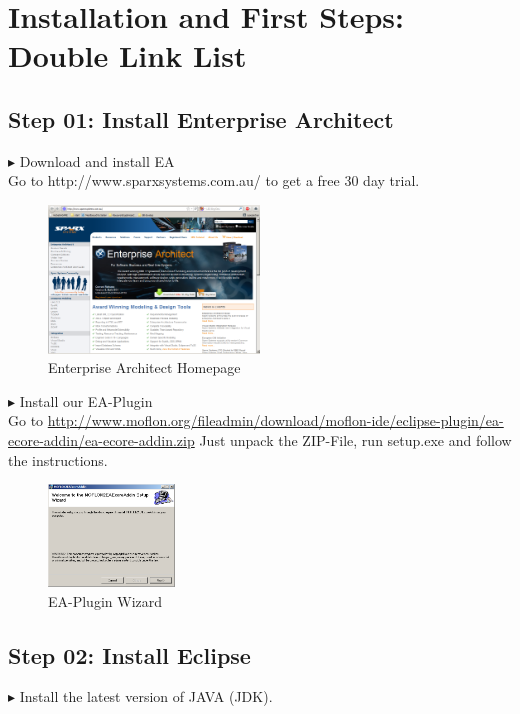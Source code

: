 \section{Installation and First Steps: Double Link List}

\subsection{Step 01: Install Enterprise Architect}
$\blacktriangleright$ Download and install EA\\
Go to http://www.sparxsystems.com.au/ to get a free 30 day trial.
\begin{figure}[!h]
	\centering
  \includegraphics[width=0.5\textwidth]{pics/ea_download.png}
	\caption{Enterprise Architect Homepage}
\end{figure}

$\blacktriangleright$ Install our EA-Plugin\\
Go to
\url{http://www.moflon.org/fileadmin/download/moflon-ide/eclipse-plugin/ea-ecore-addin/ea-ecore-addin.zip}
Just unpack the ZIP-File, run setup.exe and follow the instructions.

\begin{figure}[!h]
	\centering
  \includegraphics[width=0.3\textwidth]{pics/eaplugin_install.png}
	\caption{EA-Plugin Wizard}
\end{figure}

\subsection{Step 02: Install Eclipse}
$\blacktriangleright$ Install the latest version of JAVA (JDK).\\ %

